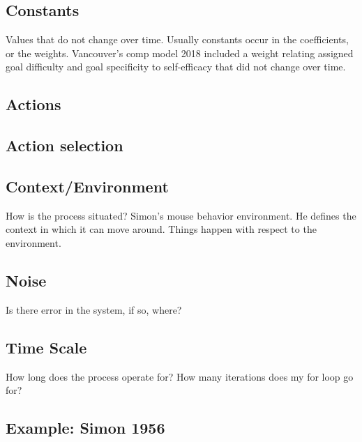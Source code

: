 \documentclass[english,,man]{apa6}
\theoremstyle{definition}
\theoremstyle{definition}
\theoremstyle{definition}
\theoremstyle{remark}
\begin{document}
\hypertarget{constants}{%
\subsection{Constants}\label{constants}}

Values that do not change over time. Usually constants occur in the
coefficients, or the weights. Vancouver's comp model 2018 included a
weight relating assigned goal difficulty and goal specificity to
self-efficacy that did not change over time.

\hypertarget{actions}{%
\subsection{Actions}\label{actions}}

\hypertarget{action-selection}{%
\subsection{Action selection}\label{action-selection}}

\hypertarget{contextenvironment}{%
\subsection{Context/Environment}\label{contextenvironment}}

How is the process situated? Simon's mouse behavior environment. He
defines the context in which it can move around. Things happen with
respect to the environment.

\hypertarget{noise}{%
\subsection{Noise}\label{noise}}

Is there error in the system, if so, where?

\hypertarget{time-scale}{%
\subsection{Time Scale}\label{time-scale}}

How long does the process operate for? How many iterations does my for
loop go for?

\hypertarget{example-simon-1956}{%
\subsection{Example: Simon 1956}\label{example-simon-1956}}
\end{document}
